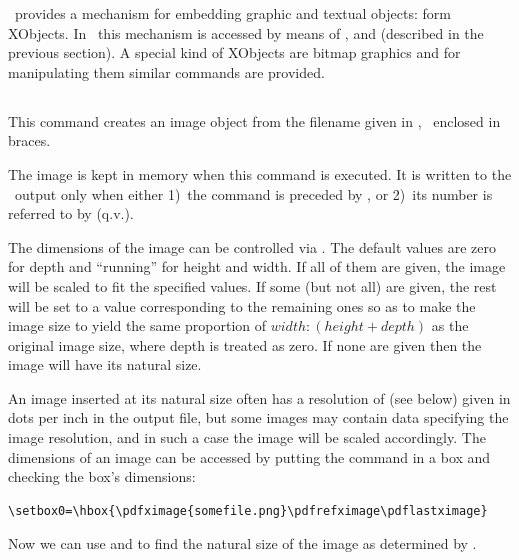 \documentclass{pdftexmanual}
\begin{document}
\PDF\ provides a mechanism for embedding graphic and textual objects:
form XObjects. In \PDFTEX\ this mechanism is accessed by means of
,  and  (described in the
previous section). A special kind of XObjects are bitmap graphics and
for manipulating them similar commands are provided.

\subsection{}

This command creates an image object from the filename given in
, \ie\ enclosed in braces.

The image is kept in memory when this command is executed. It is written
to the \PDF\ output only when either 1)~the  command is
preceded by , or 2)~its number is referred to by
 (q.v.).

The dimensions of the image can be controlled via .
The default values are zero for depth and ``running'' for height and
width. If all of them are given, the image will be scaled to fit the
specified values. If some (but not all) are given, the rest will be set
to a value corresponding to the remaining ones so as to make the image
size to yield the same proportion of $width : (height+depth)$ as the
original image size, where depth is treated as zero. If none are given
then the image will have its natural size.

An image inserted at its natural size often has a resolution of
\type{\pdfimageresolution} (see below) given in dots per inch in the
output file, but some images may contain data specifying the image
resolution, and in such a case the image will be scaled accordingly. The
dimensions of an image can be accessed by putting the 
command in a box and checking the box's dimensions:

\begin{verbatim}
\setbox0=\hbox{\pdfximage{somefile.png}\pdfrefximage\pdflastximage}
\end{verbatim}

Now we can use  and  to find the natural size of the
image as determined by \PDFTEX.
\end{document}
